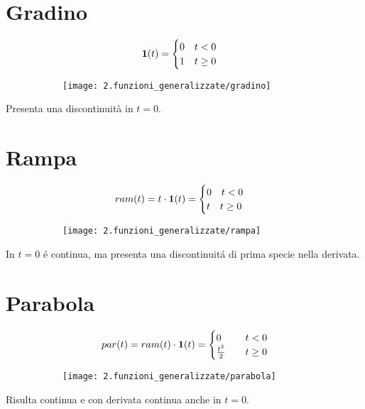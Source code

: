 \documentclass[../main.tex]{subfiles}
\begin{document}
	\section{Gradino}
		\begin{figure}[h!]
			\centering
			\begin{subfigure}{0.4\textwidth}
				\[
					\textbf{1}(t) = 
					\begin{cases}
						0 \quad t<0\\
						1 \quad t \geq 0
					\end{cases}
				\]
			\end{subfigure}
			\begin{subfigure}{0.4\textwidth}
				\texttt{[image: 2.funzioni\_generalizzate/gradino]}
			\end{subfigure}
		\end{figure}
		Presenta una discontinuità in $t=0$.
		
	\section{Rampa}
		\begin{figure}[h!]
			\centering
			\begin{subfigure}{0.4\textwidth}
				\[
					ram(t)= t \cdot \textbf{1}(t) =
					\begin{cases}
						0 \quad t<0\\
						t \quad t \geq 0			
					\end{cases}
				\]
			\end{subfigure}
			\begin{subfigure}{0.4\textwidth}
				\texttt{[image: 2.funzioni\_generalizzate/rampa]}
			\end{subfigure}
		\end{figure}
		In $t=0$ \'e continua, ma presenta una discontinuit\'a di prima specie nella derivata.
		
	\section{Parabola}
		\begin{figure}[h!]
			\centering
			\begin{subfigure}{0.4\textwidth}
				\[
					par(t)= ram(t) \cdot \textbf{1}(t) = 
					\begin{cases}
						0 \quad &t<0\\
						\frac{t^2}{2} \quad &t\geq 0
					\end{cases}
				\]
			\end{subfigure}
			\begin{subfigure}{0.4\textwidth}
				\texttt{[image: 2.funzioni\_generalizzate/parabola]}
			\end{subfigure}
		\end{figure}
		Risulta continua e con derivata continua anche in $t=0$.	
		
\end{document}
